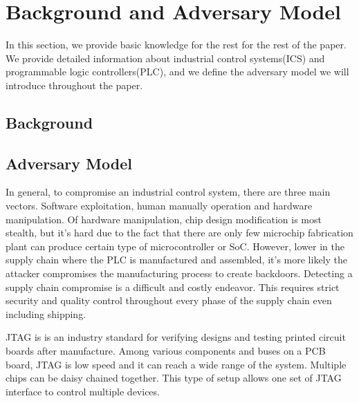 \section{Background and Adversary Model}
\label{sec:background}

In this section, we provide basic knowledge for the rest for the rest of the paper. We provide detailed information about industrial control systems(ICS) and programmable logic controllers(PLC), and we define the adversary model we will introduce throughout the paper.

\subsection{Background}





\subsection{Adversary Model}
In general, to compromise an industrial control system, there are three main vectors. Software exploitation, human manually operation and hardware manipulation. Of hardware manipulation, chip design modification is most stealth, but it's hard due to the fact that there are only few microchip fabrication plant can produce certain type of microcontroller or SoC. However, lower in the supply chain where the PLC is manufactured and assembled, it's more likely the attacker compromises the manufacturing process to create backdoors. Detecting a supply chain compromise is a difficult and costly endeavor. This requires strict security and quality control throughout every phase of the supply chain even including shipping.


JTAG is is an industry standard for verifying designs and testing printed circuit boards after manufacture. Among various components and buses on a PCB board, JTAG is low speed and it can reach a wide range of the system. Multiple chips can be daisy chained together. This type of setup allows one set of JTAG interface to control multiple devices.

